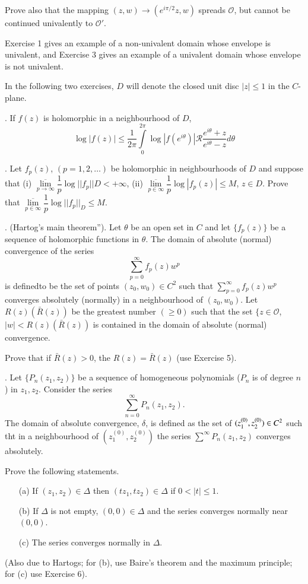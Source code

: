 Prove also that the mapping $(z, w) \to (e^{i \pi / 2} z, w)$ spreads
$\mathscr{O}$, but cannot be continued univalently to $\mathscr{O}'$.

\begin{remark*}
Exercise 1 gives an example of a non-univalent domain whose envelope
is univalent, and Exercise 3 gives an example of a univalent domain
whose envelope is not univalent. 

In the following two exercises, $D$ will denote the closed unit disc
$|z| \leq 1$ in the $C$-plane. 
\end{remark*}

. If $f(z)$ is holomorphic in a neighbourhood of $D$, 
$$
\log |f(z)| \leq \frac{1}{2\pi} \int\limits^{2\pi}_0 \log
|f(e^{i\theta})| \mathscr{R} \frac{e^{i\theta} +z}{e^{i\theta}- z} d
\theta 
$$ 

. Let $f_p(z)$, $(p=1,2,\ldots)$ be holomorphic in neighbourhoods of
$D$ and suppose that (i)  $\overline{\lim\limits_{p \to \infty}}
\dfrac{1}{p} \log ||f_p|| D < + \infty$, \quad (ii)
$\overline{\lim\limits_{p \in \infty}} \dfrac{1}{p} \log |f_p (z)|
\leq M$, $z \in D$. Prove that $\overline{\lim\limits_{p \in\infty}}
\dfrac{1}{p} \log ||f_p||_D \leq M$.

. (Hartog's main theorem''). Let $\theta$ be an open set in $C$ and
let $\{f_p(z)\}$ be a sequence of holomorphic functions in
$\theta$. The domain of absolute (normal) convergence of the series
$$
\sum\limits^\infty_{p=0} f_p (z) w^p
$$
is defined\pageoriginale to be the set of points $(z_0, w_0) \in C^2$
such that $\sum\limits^\infty_{p=0} f_p(z)w^p$ converges absolutely
(normally) in a neighbourhood of $(z_0, w_0)$. Let $R(z) (\bar{R}(z))$
be the greatest number $(\geq 0)$ such that the set $\{ z \in
\mathscr{O}$, $|w| < R (z) (\bar{R}(z))$ is contained in the domain of
absolute (normal) convergence. 

Prove that if $\bar{R}(z)>0$, the $R(z) = \bar{R}(z)$ (use Exercise
5). 

. Let $\{P_n(z_1, z_2)\}$ be a sequence of homogeneous polynomials
($P_n$ is of degree $n$) in $z_1, z_2$. Consider the series 
$$
\sum\limits^\infty_{n=0} P_n (z_1, z_2).
$$
The domain of absolute convergence, $\delta$, is defined as the set of
$(z^{(0)}_1,\break z^{(0)}_2) \in C^2$ such tht in a neighbourhood of
$(z^{(0)}_1, z^{(0)}_2)$ the series $\sum\limits^\infty P_n (z_1,
z_2)$ converges absolutely.

Prove the following statements. 
\begin{itemize}
\item[(a)] If $(z_1, z_2) \in \Delta$ then $(tz_1, tz_2) \in \Delta$
  if $0 < |t| \leq 1$.

\item[(b)] If $\Delta$ is not empty, $(0,0) \in\Delta$ and the series
  converges normally near $(0,0)$.

\item[(c)] The series converges normally in $\Delta$. 
\end{itemize}
(Also due to Hartogs; for (b), use Baire's theorem and the maximum
principle; for (c) use Exercise 6).


